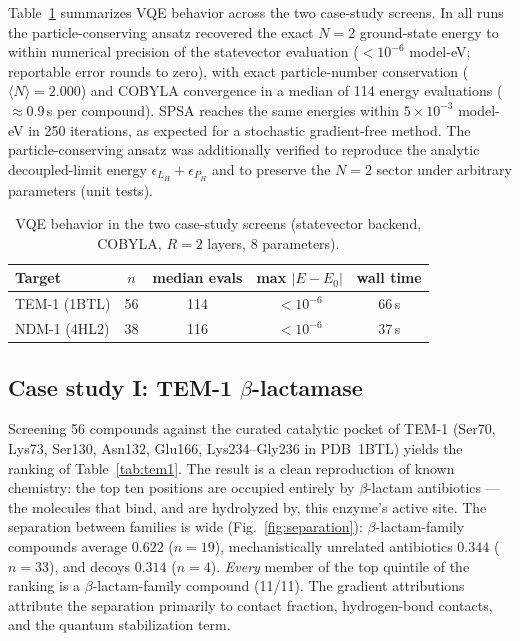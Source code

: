 \documentclass[10pt,twocolumn]{article}
\begin{document}
Table~\ref{tab:vqe} summarizes VQE behavior across the two case-study screens. In all
runs the particle-conserving ansatz recovered the exact $N{=}2$ ground-state energy to
within numerical precision of the statevector evaluation ($<10^{-6}$ model-eV;
reportable error rounds to zero), with exact particle-number conservation
($\langle N\rangle = 2.000$) and COBYLA convergence in a median of 114 energy
evaluations ($\approx$0.9\,s per compound). SPSA reaches the same energies within
$5{\times}10^{-3}$ model-eV in 250 iterations, as expected for a stochastic
gradient-free method. The particle-conserving ansatz was additionally verified to
reproduce the analytic decoupled-limit energy $\epsilon_{L_H}+\epsilon_{P_H}$ and to
preserve the $N{=}2$ sector under arbitrary parameters (unit tests).

\begin{table}[t]
\centering
\small
\caption{VQE behavior in the two case-study screens (statevector backend, COBYLA,
$R{=}2$ layers, 8 parameters).}
\label{tab:vqe}
\begin{tabular*}{\columnwidth}{@{\extracolsep{\fill}}lcccc@{}}
\toprule
Target & $n$ & median evals & max $|E-E_0|$ & wall time \\
\midrule
TEM-1 (1BTL) & 56 & 114 & $<10^{-6}$ & 66\,s \\
NDM-1 (4HL2) & 38 & 116 & $<10^{-6}$ & 37\,s \\
\bottomrule
\end{tabular*}
\end{table}

\subsection{Case study I: TEM-1 $\beta$-lactamase}

Screening 56 compounds against the curated catalytic pocket of TEM-1 (Ser70, Lys73,
Ser130, Asn132, Glu166, Lys234--Gly236 in PDB~1BTL) yields the ranking of
Table~\ref{tab:tem1}. The result is a clean reproduction of known chemistry: the top
ten positions are occupied entirely by $\beta$-lactam antibiotics --- the molecules
that bind, and are hydrolyzed by, this enzyme's active site. The separation between
families is wide (Fig.~\ref{fig:separation}): $\beta$-lactam-family compounds average
$0.622$ ($n{=}19$), mechanistically unrelated antibiotics $0.344$ ($n{=}33$), and
decoys $0.314$ ($n{=}4$). \emph{Every} member of the top quintile of the ranking is a
$\beta$-lactam-family compound (11/11). The gradient attributions attribute the
separation primarily to contact fraction, hydrogen-bond contacts, and the quantum
stabilization term.
\end{document}
